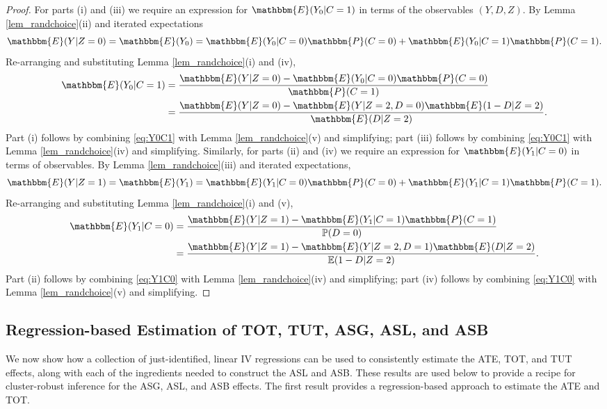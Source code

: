 \begin{proof}
For parts (i) and (iii) we require an expression for $\mathbbm{E}(Y_0|C=1)$ in terms of the observables $(Y, D, Z)$.
By Lemma \ref{lem_randchoice}(ii) and iterated expectations 
\[
\mathbbm{E}(Y|Z=0) = \mathbbm{E}(Y_0) = \mathbbm{E}(Y_0|C=0) \mathbbm{P}(C=0) + \mathbbm{E}(Y_0|C=1) \mathbbm{P}(C=1).
\]
Re-arranging and substituting Lemma \ref{lem_randchoice}(i) and (iv),
\begin{align}
\mathbbm{E}(Y_0|C=1)  &= \frac{\mathbbm{E}(Y|Z=0) - \mathbbm{E}(Y_0|C=0) \mathbbm{P}(C=0)}{\mathbbm{P}(C=1)}\nonumber\\ 
&=  \frac{\mathbbm{E}(Y|Z=0) - \mathbbm{E}(Y|Z=2,D=0) \mathbbm{E}(1 - D|Z=2)}{\mathbbm{E}(D|Z=2)}.
\label{eq:Y0C1}
\end{align}
Part (i) follows by combining \eqref{eq:Y0C1} with Lemma \ref{lem_randchoice}(v) and simplifying; part (iii) follows by combining \eqref{eq:Y0C1} with Lemma \ref{lem_randchoice}(iv) and simplifying.
Similarly, for parts (ii) and (iv) we require an expression for $\mathbbm{E}(Y_1|C=0)$ in terms of observables.
By Lemma \ref{lem_randchoice}(iii) and iterated expectations,
\[
\mathbbm{E}(Y|Z=1) = \mathbbm{E}(Y_1) = \mathbbm{E}(Y_1|C=0)\mathbbm{P}(C=0) + \mathbbm{E}(Y_1|C=1) \mathbbm{P}(C=1).
\]
Re-arranging and substituting Lemma \ref{lem_randchoice}(i) and (v),
\begin{align}
\mathbbm{E}(Y_1|C=0) 
&= \frac{\mathbbm{E}(Y|Z=1) - \mathbbm{E}(Y_1|C=1)\mathbbm{P}(C=1)}{\mathbb{P}(D=0)} \nonumber\\
&=\frac{\mathbbm{E}(Y|Z=1) - \mathbbm{E}(Y|Z=2,D=1)\mathbbm{E}(D|Z=2)}{\mathbb{E}(1-D|Z=2)}.
\label{eq:Y1C0}
\end{align}
Part (ii) follows by combining \eqref{eq:Y1C0} with Lemma \ref{lem_randchoice}(iv) and simplifying; part (iv) follows by combining \eqref{eq:Y1C0} with Lemma \ref{lem_randchoice}(v) and simplifying.
\end{proof}

\subsection{Regression-based Estimation of TOT, TUT, ASG, ASL, and ASB}

We now show how a collection of just-identified, linear IV regressions can be used to consistently estimate the ATE, TOT, and TUT effects, along with each of the ingredients needed to construct the ASL and ASB. 
These results are used below to provide a recipe for cluster-robust inference for the ASG, ASL, and ASB effects.
The first result provides a regression-based approach to estimate the ATE and TOT.


